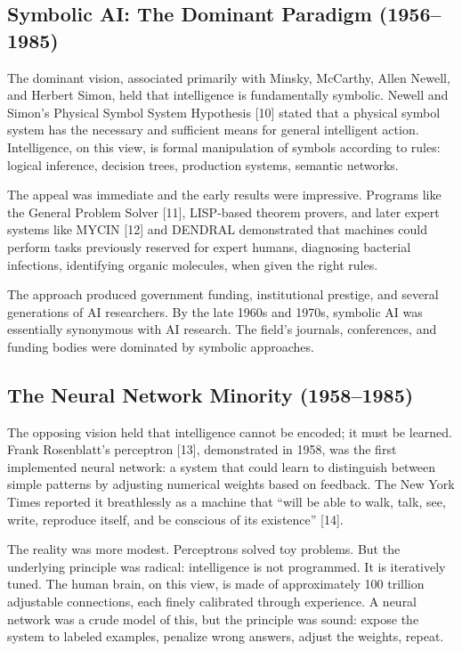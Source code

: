 \documentclass[12pt]{article}
\begin{document}
\subsection{Symbolic AI: The Dominant Paradigm (1956--1985)}\label{symbolic-ai-the-dominant-paradigm-19561985}

The dominant vision, associated primarily with Minsky, McCarthy, Allen
Newell, and Herbert Simon, held that intelligence is fundamentally
symbolic. Newell and Simon's Physical Symbol System Hypothesis {[}10{]}
stated that a physical symbol system has the necessary and sufficient
means for general intelligent action. Intelligence, on this view, is
formal manipulation of symbols according to rules: logical inference,
decision trees, production systems, semantic networks.

The appeal was immediate and the early results were impressive. Programs
like the General Problem Solver {[}11{]}, LISP-based theorem provers,
and later expert systems like MYCIN {[}12{]} and DENDRAL demonstrated
that machines could perform tasks previously reserved for expert humans,
diagnosing bacterial infections, identifying organic molecules, when
given the right rules.

The approach produced government funding, institutional prestige, and
several generations of AI researchers. By the late 1960s and 1970s,
symbolic AI was essentially synonymous with AI research. The field's
journals, conferences, and funding bodies were dominated by symbolic
approaches.

\subsection{The Neural Network Minority (1958--1985)}\label{the-neural-network-minority-19581985}

The opposing vision held that intelligence cannot be encoded; it must be
learned. Frank Rosenblatt's perceptron {[}13{]}, demonstrated in 1958,
was the first implemented neural network: a system that could learn to
distinguish between simple patterns by adjusting numerical weights based
on feedback. The New York Times reported it breathlessly as a machine
that ``will be able to walk, talk, see, write, reproduce itself, and be
conscious of its existence'' {[}14{]}.

The reality was more modest. Perceptrons solved toy problems. But the
underlying principle was radical: intelligence is not programmed. It is
iteratively tuned. The human brain, on this view, is made of
approximately 100 trillion adjustable connections, each finely
calibrated through experience. A neural network was a crude model of
this, but the principle was sound: expose the system to labeled
examples, penalize wrong answers, adjust the weights, repeat.
\end{document}

